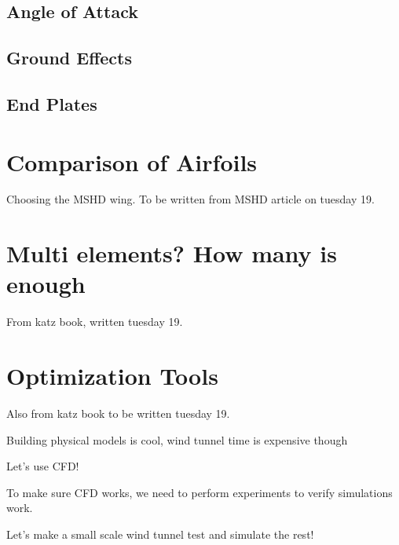   \subsection{Angle of Attack}

  \subsection{Ground Effects}

  \subsection{End Plates}


\section{Comparison of Airfoils}
Choosing the MSHD wing.
To be written from MSHD article on tuesday 19.

\section{Multi elements? How many is enough}
From katz book, written tuesday 19.

\section{Optimization Tools}

Also from katz book to be written tuesday 19.

Building physical models is cool, wind tunnel time is expensive though

Let's use CFD!

To make sure CFD works, we need to perform experiments to verify simulations work.

Let's make a small scale wind tunnel test and simulate the rest!
